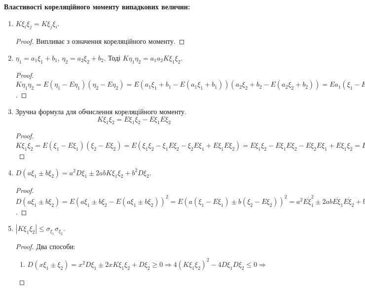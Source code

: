 \noindent \textbf{Властивості кореляційного моменту випадкових 
величин:}
\begin{enumerate}
    \item $K\xi_i\xi_j = K\xi_j\xi_i$.
    \begin{proof}
        Випливає з означення кореляційного моменту.
    \end{proof}
    \item $\eta_1 = a_1\xi_1 + b_1$, $\eta_2 = a_2\xi_2 + b_2$.
    Тоді $K\eta_1\eta_2 = a_1a_2K\xi_1\xi_2$.
    \begin{proof}
        $K\eta_1\eta_2 = E(\eta_1 - E\eta_1)(\eta_2 - E\eta_2) = 
        E(a_1\xi_1 + b_1 - E(a_1\xi_1 + b_1))
        (a_2\xi_2 + b_2 - E(a_2\xi_2 + b_2)) = 
        Ea_1(\xi_1 - E\xi_1)a_2(\xi_2 - E\xi_2) = 
        a_1a_2E(\xi_1 - E\xi_1)(\xi_2 - E\xi_2) = 
        a_1a_2K\xi_1\xi_2$.
    \end{proof}

    \item Зручна формула для обчислення кореляційного моменту.
    \begin{equation}
        K\xi_1\xi_2 = E\xi_1\xi_2 - E\xi_1 E\xi_2
    \end{equation}
    \begin{proof}
        $K\xi_1\xi_2 = E(\xi_1 - E\xi_1)(\xi_2 - E\xi_2) = 
        E(\xi_1\xi_2 - \xi_1E\xi_2 - \xi_2E\xi_1 + E\xi_1E\xi_2) = 
        E\xi_1\xi_2 - E\xi_1E\xi_2 - E\xi_2E\xi_1 + E\xi_1\xi_2 = 
        E\xi_1\xi_2 - E\xi_1E\xi_2$
    \end{proof}
    
    \item $D(a\xi_1 \pm b\xi_2) = a^2D\xi_1 \pm 2abK\xi_1\xi_2 + 
    b^2D\xi_2$.

    \begin{proof}
        $D(a\xi_1 \pm b\xi_2) = 
        E(a\xi_1 \pm b\xi_2 - E(a\xi_1 \pm b\xi_2))^2 =
        E(a(\xi_1-E\xi_1)\pm b(\xi_2 - E\xi_2))^2 = 
        a^2 E\mathring{\xi}_1^2 \pm 2abE\mathring{\xi}_1 E\mathring{\xi} _2 
        + b^2 E\mathring{\xi}_2^2 = 
        a^2D\xi_1 \pm 2abK\xi_1\xi_2 + b^2D\xi_2$.
    \end{proof}

    \item $\left|K\xi_1\xi_2\right| \leq \sigma_{\xi_1} \sigma_{\xi_2}$.
    \begin{proof}
        Два способи: 
        \begin{enumerate}[label=\Roman*.]
            \item $D(x\xi_1 \pm \xi_2) = x^2 D\xi_1 \pm 2xK\xi_1\xi_2 + D\xi_2 \geq 0 
            \Rightarrow 4(K\xi_1\xi_2)^2 - 4D\xi_1D\xi_2 \leq 0 
            \Rightarrow $


\end{enumerate}
\end{proof}
\end{enumerate}
